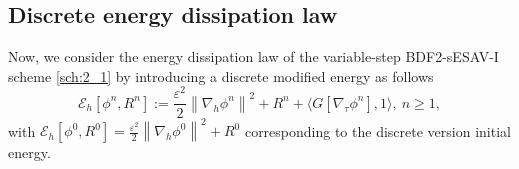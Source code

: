 \documentclass{m2an}
\begin{document}
\subsection{Discrete energy dissipation law}
Now, we consider the energy dissipation law of the variable-step BDF2-sESAV-I scheme \eqref{sch:2_1} by introducing a discrete modified energy as follows
\begin{equation}\label{def:dis_energy}
	\mathcal{E}_h[\phi^{n}, R^{n}] := \frac{\varepsilon^2}{2}\left\|\nabla_h \phi^n\right\|^2 + R^n + \langle G[ \nabla_{\tau} \phi^{n} ], 1 \rangle, ~n \ge 1,
\end{equation}
with $ \mathcal{E}_h[\phi^{0}, R^{0}] = \frac{\varepsilon^2}{2}\left\|\nabla_h \phi^0\right\|^2 + R^0 $  corresponding to the discrete version initial energy.
\end{document}
